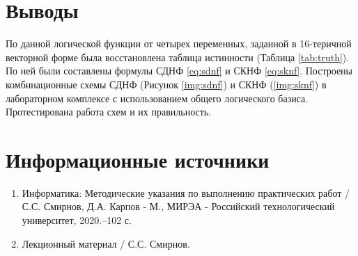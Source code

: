 \documentclass[a4paper]{article}
\begin{document}
    \section{Выводы}\label{sec:conclusion}
    По данной логической функции от четырех переменных, заданной в 16-теричной векторной форме была восстановлена таблица истинности (Таблица \ref{tab:truth}). По ней были составлены формулы СДНФ \eqref{eq:sdnf} и СКНФ \eqref{eq:sknf}. Построены комбинационные схемы СДНФ (Рисунок \ref{img:sdnf}) и СКНФ (\ref{img:sknf}) в лабораторном комплексе с использованием общего логического базиса. Протестирована работа схем и их правильность.


    \section{Информационные источники}\label{sec:sources}
    \begin{enumerate}
    	\item Информатика: Методические указания по выполнению практических 
    	работ / С.С. Смирнов, Д.А. Карпов - М., МИРЭА - Российский технологический университет, 2020.–102 с.
    	\item Лекционный материал / С.С. Смирнов.
    \end{enumerate}
\end{document}
